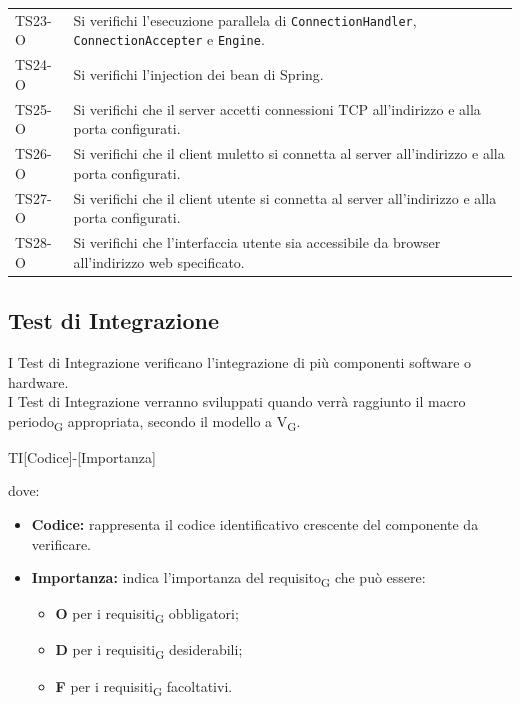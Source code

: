 \begin{longtable}{ >{\centering}p{} >{}p{}}
	TS23-O & Si verifichi l'esecuzione parallela di \texttt{ConnectionHandler}, \texttt{ConnectionAccepter} e \texttt{Engine}. \tabularnewline
	TS24-O & Si verifichi l'injection dei bean di Spring. \tabularnewline
	TS25-O & Si verifichi che il server accetti connessioni TCP all'indirizzo e alla porta configurati. \tabularnewline
	TS26-O & Si verifichi che il client muletto si connetta al server all'indirizzo e alla porta configurati. \tabularnewline
	TS27-O & Si verifichi che il client utente si connetta al server all'indirizzo e alla porta configurati. \tabularnewline
	TS28-O & Si verifichi che l'interfaccia utente sia accessibile da browser all'indirizzo web specificato. \tabularnewline
	
	
	\end{longtable}
\pagebreak
\subsection{Test di Integrazione}
I Test di Integrazione verificano l'integrazione di più componenti software o hardware.\\I Test di Integrazione verranno sviluppati quando verrà raggiunto il macro periodo\textsubscript{G} appropriata, secondo il modello a V\textsubscript{G}.
\begin{center}
	TI[Codice]-[Importanza]\\
\end{center}
dove:
\begin{itemize}
	\item \textbf{Codice:} rappresenta il codice identificativo crescente del componente da verificare.
	\item \textbf{Importanza:} indica l'importanza del requisito\textsubscript{G} che può essere:
	\begin{itemize}
		\item \textbf{O} per i requisiti\textsubscript{G} obbligatori;
		\item \textbf{D} per i requisiti\textsubscript{G} desiderabili;
		\item \textbf{F} per i requisiti\textsubscript{G} facoltativi.
	\end{itemize}
\end{itemize}



